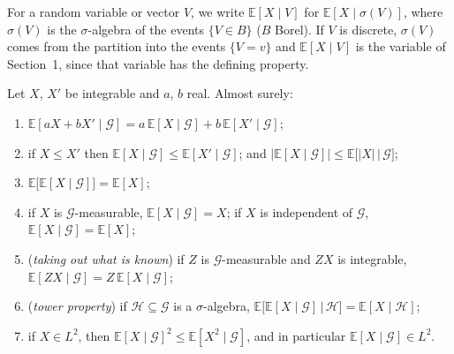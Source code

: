 For a random variable or vector $V$, we write $\mathbb E[X\mid V]$ for $\mathbb E[X\mid\sigma(V)]$, where $\sigma(V)$ is the $\sigma$-algebra of the events $\{V\in B\}$
($B$ Borel). If $V$ is discrete, $\sigma(V)$ comes from the partition into the events $\{V=v\}$ and $\mathbb E[X\mid V]$ is the variable of Section~1, since that
variable has the defining property.

\begin{proposition}\label{prop:cerules}
Let $X$, $X'$ be integrable and $a$, $b$ real. Almost surely:
\begin{enumerate}[label=(\alph*)]
\item $\mathbb E[aX+bX'\mid\mathcal G]=a\,\mathbb E[X\mid\mathcal G]+b\,\mathbb E[X'\mid\mathcal G]$;
\item if $X\le X'$ then $\mathbb E[X\mid\mathcal G]\le\mathbb E[X'\mid\mathcal G]$; and $\bigl|\mathbb E[X\mid\mathcal G]\bigr|\le\mathbb E\bigl[|X|\,\big|\,\mathcal G\bigr]$;
\item $\mathbb E\bigl[\mathbb E[X\mid\mathcal G]\bigr]=\mathbb E[X]$;
\item if $X$ is $\mathcal G$-measurable, $\mathbb E[X\mid\mathcal G]=X$; if $X$ is independent of $\mathcal G$, $\mathbb E[X\mid\mathcal G]=\mathbb E[X]$;
\item (\emph{taking out what is known}) if $Z$ is $\mathcal G$-measurable and $ZX$ is integrable, $\mathbb E[ZX\mid\mathcal G]=Z\,\mathbb E[X\mid\mathcal G]$;
\item (\emph{tower property}) if $\mathcal H\subseteq\mathcal G$ is a $\sigma$-algebra, $\mathbb E\bigl[\mathbb E[X\mid\mathcal G]\,\big|\,\mathcal H\bigr]=\mathbb E[X\mid\mathcal H]$;
\item if $X\in L^2$, then $\mathbb E[X\mid\mathcal G]^2\le\mathbb E[X^2\mid\mathcal G]$, and in particular $\mathbb E[X\mid\mathcal G]\in L^2$.
\end{enumerate}
\end{proposition}

